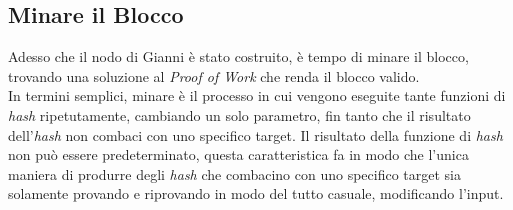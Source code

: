 \subsection{Minare il Blocco}
Adesso che il nodo di Gianni \`e stato costruito, \`e tempo di minare il blocco, trovando una soluzione al \textit{Proof of Work} che renda il blocco valido.\\
In termini semplici, minare \`e il processo in cui vengono eseguite tante funzioni di \textit{hash} ripetutamente, cambiando un solo parametro, fin tanto che il risultato dell'\textit{hash} non combaci con uno specifico target. Il risultato della funzione di \textit{hash} non pu\`o essere predeterminato, questa caratteristica fa in modo che l'unica maniera di produrre degli \textit{hash} che combacino con uno specifico target sia solamente provando e riprovando in modo del tutto casuale, modificando l'input.


